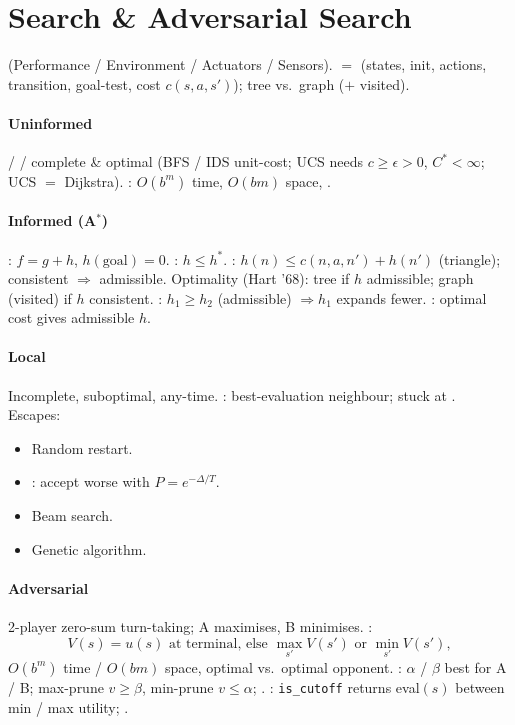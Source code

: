 \section{Search \& Adversarial Search}
 (Performance / Environment / Actuators / Sensors).  $=$ (states, init, actions, transition, goal-test, cost $c(s,a,s')$); tree vs.\ graph ($+$ visited).
\paragraph{Uninformed}  /  /  complete \& optimal (BFS / IDS unit-cost; UCS needs $c{\geq}\epsilon{>}0$, $C^*{<}\infty$; UCS $=$ Dijkstra). : $O(b^m)$ time, $O(bm)$ space, .
\paragraph{Informed (A$^*$)} : $f{=}g{+}h$, $h(\text{goal}){=}0$. : $h{\leq}h^*$. : $h(n){\leq}c(n,a,n'){+}h(n')$ (triangle); consistent $\Rightarrow$ admissible. Optimality (Hart '68): tree if $h$ admissible; graph (visited) if $h$ consistent. : $h_1{\geq}h_2$ (admissible) $\Rightarrow h_1$ expands fewer. : optimal cost gives admissible $h$. 
\paragraph{Local} Incomplete, suboptimal, any-time. : best-evaluation neighbour; stuck at . Escapes:
\begin{itemize}
\item Random restart.
\item {}: accept worse with $P{=}e^{-\Delta/T}$.
\item Beam search.
\item Genetic algorithm.
\end{itemize}
\paragraph{Adversarial} 2-player zero-sum turn-taking; A maximises, B minimises. :
\[V(s)=u(s)\text{ at terminal, else }\max_{s'}V(s')\text{ or }\min_{s'}V(s'),\]
$O(b^m)$ time / $O(bm)$ space, optimal vs.\ optimal opponent. : $\alpha$ / $\beta$ best for A / B; max-prune $v{\geq}\beta$, min-prune $v{\leq}\alpha$; . : \texttt{is\_cutoff} returns eval$(s)$ between min / max utility; .
